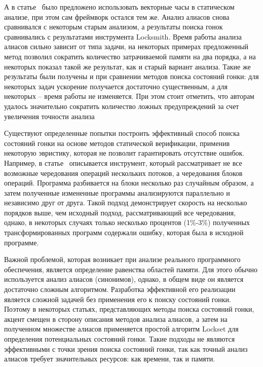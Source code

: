 А в статье~\cite{Zhou:2018} было предложено использовать векторные часы в статическом анализе, при этом сам фреймворк остался тем же.
Анализ алиасов снова сравнивался с некоторым старым анализом, а результаты поиска гонок сравнивались с результатами инструмента Locksmith.
Время работы анализа алиасов сильно зависит от типа задачи, на некоторых примерах предложенный метод позволил сократить количество затрачиваемой памяти на два порядка, а на некоторых показал такой же результат, как и старый вариант анализа. 
Такие же результаты были получены и при сравнении методов поиска состояний гонки: для некоторых задач ускорение получается достаточно существенным, а для некоторых -- время работы не изменяется.
При этом стоит отметить, что авторам удалось значительно сократить количество ложных предупреждений за счет увеличения точности анализа

Существуют определенные попытки построить эффективный способ поиска состояний гонки на основе методов статической верификации, применив некоторую эвристику, которая не позволит гарантировать отсутствие ошибок.
Например, в статье~\cite{VerySMART} описывается инструмент, который рассматривает не все возможные чередования операций нескольких потоков, а чередования блоков операций. 
Программа разбивается на блоки несколько раз случайным образом, а затем полученные измененные программы анализируются параллельно и независимо друг от друга.
Такой подход демонстрирует скорость на несколько порядков выше, чем исходный подход, рассматривающий все чередования, однако, в некоторых случаях только несколько процентов (1\%-3\%) полученных трансформированных программ содержали ошибку, которая была в исходной программе. 


Важной проблемой, которая возникает при анализе реального программного обеспечения, является определение равенства областей памяти.
Для этого обычно используется анализ алиасов (синонимов), однако, в общем виде он является достаточно сложным алгоритмом.
Разработка эффективной его реализации является сложной задачей без применения его к поиску состояний гонки.
Поэтому в некоторых статьях, представляющих методы поиска состояний гонки, акцент смещен в сторону описания методов анализа алиасов, а затем на полученном множестве алиасов применяется простой алгоритм Lockset для определения потенциальных состояний гонки. 
Такие подходы не являются эффективными с точки зрения поиска состояний гонки, так как точный анализ алиасов требует значительных ресурсов: как времени, так и памяти.

